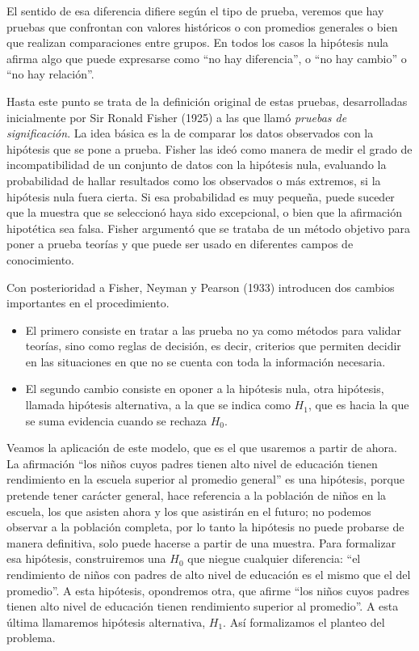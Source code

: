 \documentclass[]{book}
\begin{document}
El sentido de esa diferencia difiere según el tipo de prueba, veremos
que hay pruebas que confrontan con valores históricos o con promedios
generales o bien que realizan comparaciones entre grupos. En todos los
casos la hipótesis nula afirma algo que puede expresarse como ``no hay
diferencia'', o ``no hay cambio'' o ``no hay relación''.

Hasta este punto se trata de la definición original de estas pruebas,
desarrolladas inicialmente por Sir Ronald Fisher (1925) a las que llamó
\emph{pruebas de significación}. La idea básica es la de comparar los datos
observados con la hipótesis que se pone a prueba. Fisher las ideó como
manera de medir el grado de incompatibilidad de un conjunto de datos con la hipótesis nula, evaluando la probabilidad de hallar resultados como los observados o más extremos, si la hipótesis nula fuera cierta. Si esa probabilidad es muy pequeña, puede suceder que la muestra que se
seleccionó haya sido excepcional, o bien que la afirmación hipotética
sea falsa. Fisher argumentó que se trataba de un método objetivo para
poner a prueba teorías y que puede ser usado en diferentes campos de
conocimiento.

Con posterioridad a Fisher, Neyman y Pearson (1933) introducen dos
cambios importantes en el procedimiento.

\begin{itemize}
\item
  El primero consiste en tratar a las prueba no ya como métodos para
  validar teorías, sino como reglas de decisión, es decir, criterios que
  permiten decidir en las situaciones en que no se cuenta con toda la
  información necesaria.
\item
  El segundo cambio consiste en oponer a la hipótesis nula, otra hipótesis, llamada hipótesis alternativa, a la que se indica como \(H_{1}\), que es hacia la que se suma evidencia cuando se rechaza \(H_{0}\).
\end{itemize}

Veamos la aplicación de este modelo, que es el que usaremos a partir de
ahora. La afirmación ``los niños cuyos padres tienen alto nivel de
educación tienen rendimiento en la escuela superior al promedio general'' es una hipótesis, porque pretende tener carácter general, hace
referencia a la población de niños en la escuela, los que asisten ahora
y los que asistirán en el futuro; no podemos observar a la población
completa, por lo tanto la hipótesis no puede probarse de manera
definitiva, solo puede hacerse a partir de una muestra. Para formalizar
esa hipótesis, construiremos una \(H_{0}\) que niegue cualquier diferencia: ``el rendimiento de niños con padres de alto nivel de educación es el mismo que el del promedio''. A esta hipótesis, opondremos otra, que afirme ``los niños cuyos padres tienen alto nivel de educación tienen rendimiento superior al promedio''. A esta última llamaremos hipótesis alternativa, \(H_{1}\). Así formalizamos el planteo del problema.
\end{document}
